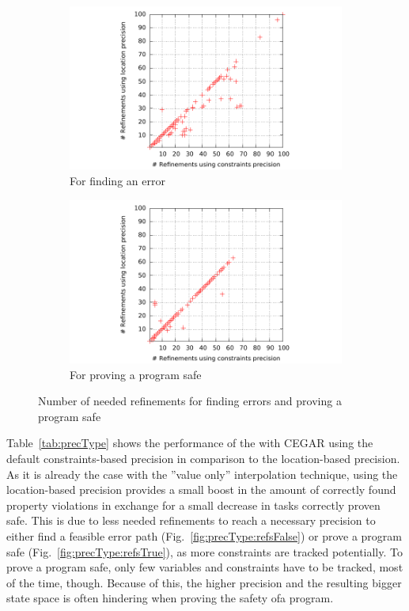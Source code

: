 \begin{figure}
\begin{subfigure}[b]{.48\textwidth}
\includegraphics[trim=2cm 0 1cm 0, clip=true, scale=.9]{evaluation/sp_constPrec_locPrec_refinementsErrorFinding}
\caption{For finding an error}
\end{subfigure}%
\hfill
\begin{subfigure}[b]{.48\textwidth}
\includegraphics[trim=2cm 0 1cm 0, clip=true, scale=.9]{evaluation/sp_constPrec_locPrec_refinementsSafeProving}
\caption{For proving a program safe}
\end{subfigure}
\caption{Number of needed refinements for finding errors and proving a program safe}
\end{figure}

Table~\ref{tab:precType} shows the performance of the \symbolicExecutionCPA with CEGAR using the default constraints-based precision in comparison to the location-based precision.
As it is already the case with the ''value only'' interpolation technique, using the location-based precision provides a small boost in the amount of correctly found property violations in exchange for a small decrease in tasks correctly proven safe.
This is due to less needed refinements to reach a necessary precision to either find a feasible error path (Fig.~\ref{fig:precType:refsFalse}) or prove a program safe (Fig.~\ref{fig:precType:refsTrue}), as more constraints are tracked potentially.
To prove a program safe, only few variables and constraints have to be tracked, most of the time, though.
Because of this, the higher precision and the resulting bigger state space is often hindering when proving the safety ofa program.

